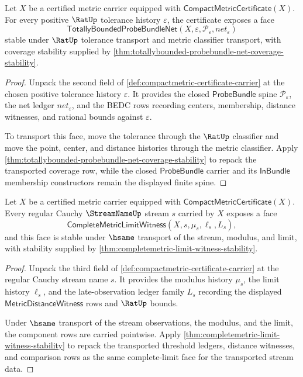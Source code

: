 \begin{theorem}
\label{thm:compactmetric-total-bounded-field-projection}
Let $X$ be a certified metric carrier equipped with
$\mathsf{CompactMetricCertificate}(X)$. For every positive $\RatUp$ tolerance
history $\varepsilon$, the certificate exposes a face
$$
\mathsf{TotallyBoundedProbeBundleNet}(X,\varepsilon,\mathcal{P}_{\varepsilon},net_{\varepsilon})
$$
stable under $\RatUp$ tolerance transport and metric classifier transport, with
coverage stability supplied by
\autoref{thm:totallybounded-probebundle-net-coverage-stability}.
\end{theorem}
\begin{proof}
Unpack the second field of \autoref{def:compactmetric-certificate-carrier} at
the chosen positive tolerance history $\varepsilon$. It provides the closed
$\mathsf{ProbeBundle}$ spine $\mathcal{P}_{\varepsilon}$, the net ledger
$net_{\varepsilon}$, and the BEDC rows recording centers, membership, distance
witnesses, and rational bounds against $\varepsilon$.

To transport this face, move the tolerance through the $\RatUp$ classifier and
move the point, center, and distance histories through the metric classifier.
Apply \autoref{thm:totallybounded-probebundle-net-coverage-stability} to repack
the transported coverage row, while the closed $\mathsf{ProbeBundle}$ carrier
and its $\mathsf{InBundle}$ membership constructors remain the displayed finite
spine.
\end{proof}

\begin{theorem}
\label{thm:compactmetric-complete-field-projection}
Let $X$ be a certified metric carrier equipped with
$\mathsf{CompactMetricCertificate}(X)$. Every regular Cauchy $\StreamNameUp$
stream $s$ carried by $X$ exposes a face
$$
\mathsf{CompleteMetricLimitWitness}(X,s,\mu_s,\ell_s,L_s),
$$
and this face is stable under $\hsame$ transport of the stream, modulus, and
limit, with stability supplied by
\autoref{thm:completemetric-limit-witness-stability}.
\end{theorem}
\begin{proof}
Unpack the third field of \autoref{def:compactmetric-certificate-carrier} at the
regular Cauchy stream name $s$. It provides the modulus history $\mu_s$, the
limit history $\ell_s$, and the late-observation ledger family $L_s$ recording
the displayed $\mathsf{MetricDistanceWitness}$ rows and $\RatUp$ bounds.

Under $\hsame$ transport of the stream observations, the modulus, and the
limit, the component rows are carried pointwise. Apply
\autoref{thm:completemetric-limit-witness-stability} to repack the transported
threshold ledgers, distance witnesses, and comparison rows as the same
complete-limit face for the transported stream data.
\end{proof}

